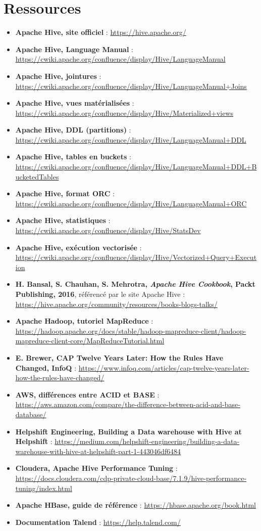 \newpage
\section*{Ressources}
{}

\begin{itemize}
	\item \textbf{Apache Hive, site officiel} : \url{https://hive.apache.org/}
	\item \textbf{Apache Hive, Language Manual} : \url{https://cwiki.apache.org/confluence/display/Hive/LanguageManual}
	\item \textbf{Apache Hive, jointures} : \url{https://cwiki.apache.org/confluence/display/Hive/LanguageManual+Joins}
	\item \textbf{Apache Hive, vues matérialisées} : \url{https://cwiki.apache.org/confluence/display/Hive/Materialized+views}
	\item \textbf{Apache Hive, DDL (partitions)} : \url{https://cwiki.apache.org/confluence/display/Hive/LanguageManual+DDL}
	\item \textbf{Apache Hive, tables en buckets} : \url{https://cwiki.apache.org/confluence/display/Hive/LanguageManual+DDL+BucketedTables}
	\item \textbf{Apache Hive, format ORC} : \url{https://cwiki.apache.org/confluence/display/Hive/LanguageManual+ORC}
	\item \textbf{Apache Hive, statistiques} : \url{https://cwiki.apache.org/confluence/display/Hive/StatsDev}
	\item \textbf{Apache Hive, exécution vectorisée} : \url{https://cwiki.apache.org/confluence/display/Hive/Vectorized+Query+Execution}
	\item \textbf{H. Bansal, S. Chauhan, S. Mehrotra, \textit{Apache Hive Cookbook}, Packt Publishing, 2016}, référencé par le site Apache Hive : \url{https://hive.apache.org/community/resources/books-blogs-talks/}
	\item \textbf{Apache Hadoop, tutoriel MapReduce} : \url{https://hadoop.apache.org/docs/stable/hadoop-mapreduce-client/hadoop-mapreduce-client-core/MapReduceTutorial.html}
	\item \textbf{E. Brewer, \og CAP Twelve Years Later: How the Rules Have Changed\fg{}, InfoQ} : \url{https://www.infoq.com/articles/cap-twelve-years-later-how-the-rules-have-changed/}
	\item \textbf{AWS, différences entre ACID et BASE} : \url{https://aws.amazon.com/compare/the-difference-between-acid-and-base-database/}
	\item \textbf{Helpshift Engineering, \og Building a Data warehouse with Hive at Helpshift\fg{}} : \url{https://medium.com/helpshift-engineering/building-a-data-warehouse-with-hive-at-helpshift-part-1-443046df6484}
	\item \textbf{Cloudera, Apache Hive Performance Tuning} : \url{https://docs.cloudera.com/cdp-private-cloud-base/7.1.9/hive-performance-tuning/index.html}
	\item \textbf{Apache HBase, guide de référence} : \url{https://hbase.apache.org/book.html}
	\item \textbf{Documentation Talend} : \url{https://help.talend.com/}
\end{itemize}
